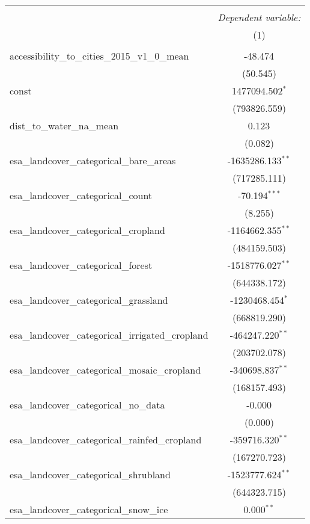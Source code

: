 \begin{table}[!htbp] \centering
\begin{tabular}{@{\extracolsep{5pt}}lc}
\\[-1.8ex]\hline
\hline \\[-1.8ex]
& \multicolumn{1}{c}{\textit{Dependent variable:}} \
\cr \cline{1-2}
\\[-1.8ex] & (1) \\
\hline \\[-1.8ex]
 accessibility_to_cities_2015_v1_0_mean & -48.474$^{}$ \\
  & (50.545) \\
 const & 1477094.502$^{*}$ \\
  & (793826.559) \\
 dist_to_water_na_mean & 0.123$^{}$ \\
  & (0.082) \\
 esa_landcover_categorical_bare_areas & -1635286.133$^{**}$ \\
  & (717285.111) \\
 esa_landcover_categorical_count & -70.194$^{***}$ \\
  & (8.255) \\
 esa_landcover_categorical_cropland & -1164662.355$^{**}$ \\
  & (484159.503) \\
 esa_landcover_categorical_forest & -1518776.027$^{**}$ \\
  & (644338.172) \\
 esa_landcover_categorical_grassland & -1230468.454$^{*}$ \\
  & (668819.290) \\
 esa_landcover_categorical_irrigated_cropland & -464247.220$^{**}$ \\
  & (203702.078) \\
 esa_landcover_categorical_mosaic_cropland & -340698.837$^{**}$ \\
  & (168157.493) \\
 esa_landcover_categorical_no_data & -0.000$^{}$ \\
  & (0.000) \\
 esa_landcover_categorical_rainfed_cropland & -359716.320$^{**}$ \\
  & (167270.723) \\
 esa_landcover_categorical_shrubland & -1523777.624$^{**}$ \\
  & (644323.715) \\
 esa_landcover_categorical_snow_ice & 0.000$^{**}$ \\

\end{tabular}
\end{table}

